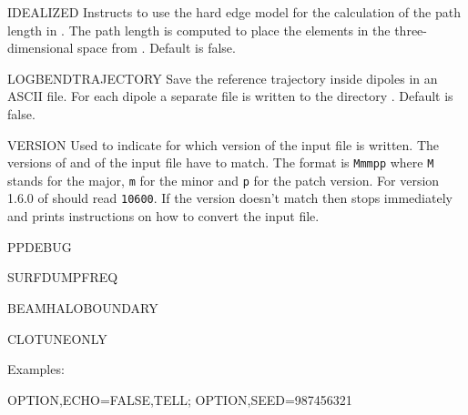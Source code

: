 \begin{kdescription}
  \item[IDEALIZED]
  Instructs to use the hard edge model for the calculation of the path length in \opalt. The path length is computed to place the elements in the three-dimensional space from . Default is false.

  \item[LOGBENDTRAJECTORY]
  Save the reference trajectory inside dipoles in an ASCII file. For each dipole a separate file is written to the directory . Default is false.

  \item[VERSION]
  Used to indicate for which version of \opal the input file is written. The versions of \opal and of the input file have to match. The format is \texttt{Mmmpp} where \texttt{M} stands for the major, \texttt{m} for the minor and \texttt{p} for the patch version. For version 1.6.0 of \opal {} should read \texttt{10600}. If the version doesn't match then \opal stops immediately and prints instructions on how to convert the input file.

  \item[PPDEBUG]

  \item[SURFDUMPFREQ]

  \item[BEAMHALOBOUNDARY]

  \item[CLOTUNEONLY]
\end{kdescription}


\noindent Examples:
\begin{example}
OPTION,ECHO=FALSE,TELL;
OPTION,SEED=987456321
\end{example}


